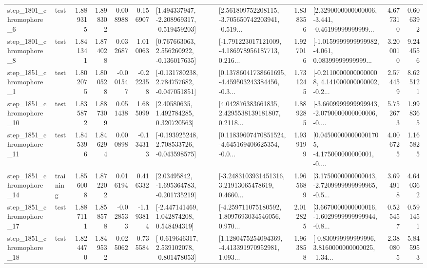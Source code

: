 \begin{tabular}{llrrrrllrlrr}
  step\_1801\_chromophore\_6 &      test &      1.889315 &    1.898302 &      0.008988 &  0.156907 &   [1.494337947, -2.208969317, -0.519459203] &  [2.561809752208115, -3.705650742203941, -0.519... &       1.838356 &  [2.3290000000000006, -3.441, -0.46199999999999... &            4.677310 &          0.606392 \\
  step\_1801\_chromophore\_8 &      test &      1.841341 &    1.874028 &      0.032687 &  1.010063 &    [0.767663063, 2.556260922, -0.136017635] &  [-1.791223017121009, -4.186978956187713, 0.216... &       1.927016 &  [-1.0159999999999982, -4.061, 0.08399999999999... &            3.200010 &          9.244556 \\
  step\_1851\_chromophore\_1 &      test &      1.802075 &    1.800528 &     -0.001547 & -0.222358 &   [-0.131780238, 2.784757682, -0.047051851] &  [0.13786041738661695, -4.459503243384456, -0.3... &       1.731245 &  [-0.21100000000000008, 4.141000000000002, -0.2... &            2.574459 &          8.625121 \\
 step\_1851\_chromophore\_10 &      test &      1.835872 &    1.887309 &      0.051438 &  1.685099 &      [2.40580635, 1.492784285, 0.320720563] &  [4.042876383661835, 2.4295538139181807, 0.2118... &       1.889285 &  [-3.6609999999999943, -2.0790000000000006, -0.... &            5.752673 &          1.998365 \\
 step\_1851\_chromophore\_11 &      test &      1.845396 &    1.846294 &      0.000898 & -0.134313 &   [-0.193925248, 2.708533726, -0.043598575] &  [0.11839607470851524, -4.645169406625354, -0.0... &       1.939199 &  [0.045000000000001705, -4.175000000000001, -0.... &            4.006725 &          1.165825 \\
 step\_1851\_chromophore\_14 &  training &      1.856008 &    1.872202 &      0.016194 &  0.416332 &    [2.03495842, -1.695364783, -0.201735219] &  [-3.2483103931451316, 3.21913065478619, 0.4660... &       1.965689 &  [3.1750000000000043, -2.7209999999999965, -0.5... &            3.694918 &          4.640362 \\
 step\_1851\_chromophore\_17 &      test &      1.887111 &    1.858578 &     -0.028533 & -1.193814 &    [-2.447141469, 1.042874208, 0.548494319] &  [-4.259711075180592, 1.8097693034546056, 0.970... &       2.012825 &  [3.6670000000000016, -1.6029999999999944, -0.8... &            0.525457 &          0.591451 \\
 step\_1851\_chromophore\_18 &      test &      1.824470 &    1.849532 &      0.025062 &  0.735584 &   [-0.619646317, 2.539102078, -0.801478053] &  [1.1280475254094369, -4.413391970952981, 1.093... &       1.963858 &  [-0.830999999999996, 3.8160000000000025, -1.34... &            2.380805 &          5.845953 \\

\end{tabular}

